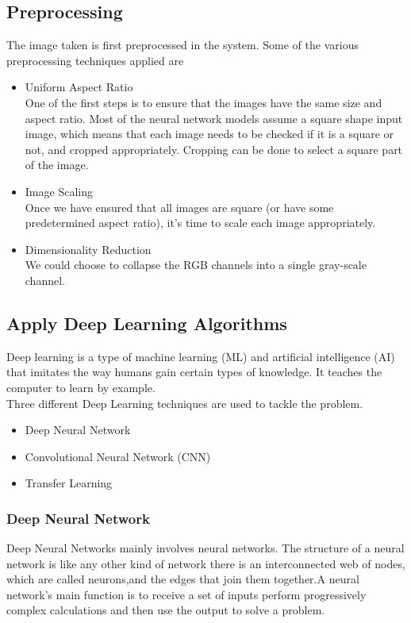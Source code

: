 \subsection{Preprocessing}
The image taken is first preprocessed in the system. Some of the various preprocessing techniques applied are
\begin{itemize}
    \item{Uniform Aspect Ratio}\\One of the first steps is to ensure that the images have the same size and aspect ratio. Most of the neural network models assume a square shape input image, which means that each image needs to be checked if it is a square or not, and cropped appropriately. Cropping can be done to select a square part of the image.
    \item{Image Scaling}\\Once we have ensured that all images are square (or have some predetermined aspect ratio), it’s time to scale each image appropriately. 
    \item{Dimensionality Reduction}\\We could choose to collapse the RGB channels into a single gray-scale channel.
\end{itemize}
\subsection{Apply Deep Learning Algorithms}
Deep learning is a type of machine learning (ML) and artificial intelligence (AI) that imitates the way humans gain certain types of knowledge. It teaches the computer to learn by example.\\
Three different Deep Learning techniques are used to tackle the problem.
\begin{itemize}
    \item Deep Neural Network
    \item Convolutional Neural Network (CNN)
    \item Transfer Learning
\end{itemize}
\subsubsection{Deep Neural Network}
Deep Neural Networks mainly involves neural networks.
The structure of a neural network is like any other kind of network there is an interconnected web of nodes, which are called neurons,and the edges that join them together.A neural network's main function is to receive a set of inputs perform progressively complex calculations and then use the output to solve a problem.
